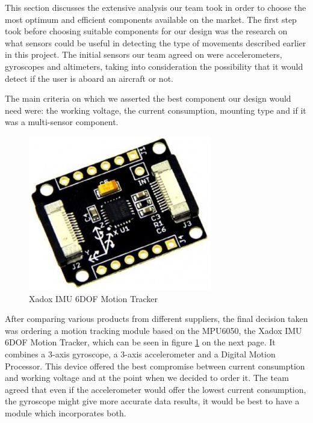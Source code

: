 This section discusses the extensive analysis our team took in order to choose the most optimum and efficient components available on the market. The first step took before choosing suitable components for our design was the research on what sensors could be useful in detecting the type of movements described earlier in this project. The initial sensors our team agreed on were accelerometers, gyroscopes and altimeters, taking into consideration the possibility that it would detect if the user is aboard an aircraft or not.

The main criteria on which we asserted the best component our design would need were: the working voltage, the current consumption, mounting type and if it was a multi-sensor component.
\begin{figure}
\centering
\includegraphics[scale=0.4]{figures/Xadow_IMU_6DOF.PNG}
\caption{Xadox IMU 6DOF Motion Tracker \label{fig:xadox}}
\end{figure}
After comparing various products from different suppliers, the final decision taken was ordering a motion tracking module based on the MPU6050, the Xadox IMU 6DOF Motion Tracker, which can be seen in figure \ref{fig:xadox} on the next page. It combines a 3-axis gyroscope, a 3-axis accelerometer and a Digital Motion Processor. This device offered the best compromise between current consumption and working voltage and at the point when we decided to order it. The team agreed that even if the accelerometer would offer the lowest current consumption, the gyroscope might give more accurate data results, it would be best to have a module which incorporates both.
